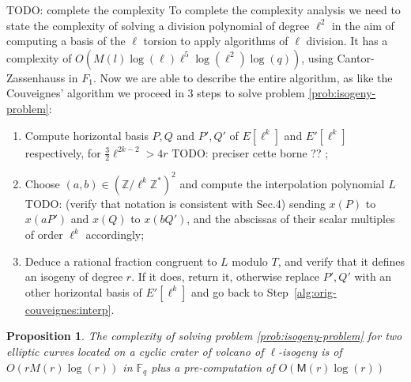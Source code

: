\documentclass{lms}
\newcommand{\todo}[1]{{\color{red}TODO: #1}}
\newtheorem{prop}[thm]{Proposition}
\newcommand{\F}{\mathbb{F}}
\begin{document}


\todo{complete the complexity}
 To complete the complexity analysis we need to state the complexity of solving a division polynomial of degree $\ell^2$ in the aim of computing a basis of the $\ell$ torsion to apply algorithms of $\ell$ division. It has a complexity of $O(M(l)\log(\ell) \ell^5 \log(\ell^2) \log(q))$, using Cantor-Zassenhauss in $F_1$. %
 \newline
  Now we are able to describe the entire algorithm,   
  as like the Couveignes' algorithm we proceed in 3 steps to solve problem \ref{prob:isogeny-problem}:
 \begin{enumerate}
\item Compute horizontal basis $P,Q$ and $P',Q'$ of
  $E[\ell^k]$ and $E'[\ell^k]$ respectively, for $\frac{3}{2}\ell^{2k-2} > 4r$ \todo{preciser cette borne ??} ;
\item\label{alg:modif-couveignes:interp} Choose $(a,b) \in (\mathbb{Z}/\ell^k\mathbb{Z}^*)^2$ and compute the interpolation
  polynomial $L$ \todo{(verify that notation is consistent
    with Sec.4)} sending $x(P)$ to $x(aP')$ and $x(Q)$ to $x(bQ')$, and the abscissas of
  their scalar multiples of order $\ell^k$ accordingly;
\item\label{alg:modif-couveignes:rational} Deduce a rational fraction
  congruent to $L$ modulo $T$, and verify that it
  defines an isogeny of degree $r$. If it does, return it, otherwise
  replace $P',Q'$ with an other horizontal basis of $E'[\ell^k]$ and go back to
  Step~\ref{alg:orig-couveignes:interp}.
\end{enumerate} 

\begin{prop}
The complexity of solving problem \ref{prob:isogeny-problem} for two elliptic curves located on a cyclic crater of volcano of $\ell$-isogeny is of $O(rM(r)\log(r))$ in $\mathbb{F}_q$ plus a pre-computation of $O(\mathsf{M}(r)\log(r))$
\end{prop}
\end{document}
